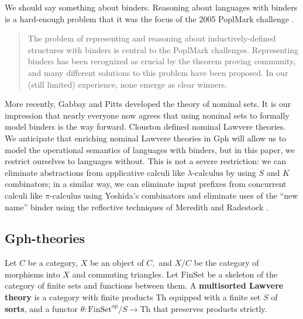\documentclass[submission,copyright,creativecommons]{eptcs}
\newcommand{\maps}{\colon}
\newcommand{\Th}{\mathrm{Th}}
\newcommand{\FinSet}{\mathrm{FinSet}}
\newcommand{\op}{\mathrm{op}}
\newcommand{\pic}{$\pi\mbox{-calculus}$\xspace}
\newcommand{\lac}{$\lambda\mbox{-calculus}$\xspace}
\begin{document}
We should say something about binders.  Reasoning about languages with binders is a hard-enough problem that it was the focus of the 2005 PoplMark challenge \cite{PoplMark}.
\begin{quote}
  The problem of representing and reasoning about inductively-defined structures with binders is central to the PoplMark challenges. Representing binders has been recognized as crucial by the theorem proving community, and many different solutions to this problem have been proposed. In our (still limited) experience, none emerge as clear winners.
\end{quote}
More recently, Gabbay and Pitts \cite{GabbayPitts} developed the theory of nominal sets.  It is our impression that nearly everyone now agrees that using nominal sets to formally model binders is the way forward.  Clouston \cite{Clouston}
defined nominal Lawvere theories.  We anticipate that enriching nominal Lawvere theories in Gph will allow us to model the operational semantics of languages with binders, but in this paper, we restrict ourselves to languages without.  This is not a severe restriction: we can eliminate abstractions from applicative calculi like \lac by using $S$ and $K$ combinators; in a similar way, we can eliminate input prefixes from concurrent calculi like \pic using Yoshida's combinators \cite{Yoshida} and eliminate uses of the ``new name'' binder using the reflective techniques of Meredith and Radestock \cite{MeredithRadestock}.


\subsection{Gph-theories}

Let $C$ be a category, $X$ be an object of $C,$ and $X/C$ be the category of morphisms into $X$ and commuting triangles.  Let $\FinSet$ be a skeleton of the category of finite sets and functions between them.  A {\bf multisorted Lawvere theory} is a category with finite products Th equipped with a finite set $S$ of {\bf sorts}, and a functor $\theta\maps \FinSet^{\op}/S \to \Th$ that preserves products strictly.
\end{document}
